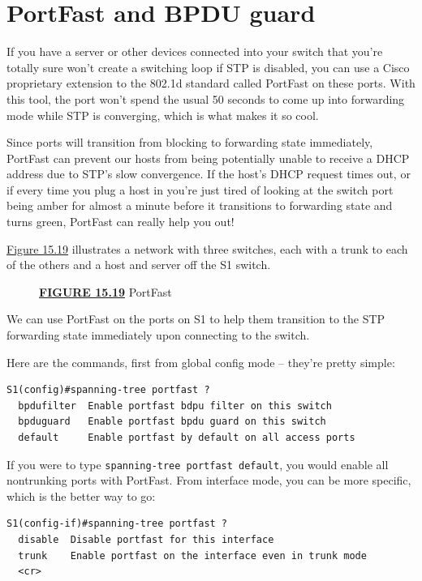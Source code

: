 \documentclass[b5paper,11pt]{memoir}
\begin{document}
\section{PortFast and BPDU guard}

If you have a server or other devices connected into your switch that
you're totally sure won't create a switching loop if STP is disabled,
you can use a Cisco proprietary extension to the 802.1d standard called
PortFast on these ports. With this tool, the port won't spend
the usual 50 seconds
to come up into forwarding mode while STP is converging, which is what
makes it so cool.

Since ports will transition from blocking to forwarding state
immediately, PortFast can prevent our hosts from being potentially
unable to receive a DHCP address due to STP's slow convergence. If the
host's DHCP request times out, or if every time you plug a host in
you're just tired of looking at the switch port being amber for almost a
minute before it transitions to forwarding state and turns green,
PortFast can really help you out!

\protect\hyperlink{c15.xhtmlux5cux23figure15-19}{Figure 15.19}
illustrates a network with three switches, each with a trunk to each of
the others and a host and server off the S1 switch.

\begin{figure}
\centering
\caption{{\protect\hyperlink{c15.xhtmlux5cux23figureanchor15-19}{\textbf{FIGURE
15.19}} PortFast}}
\end{figure}

We can use PortFast on the ports on S1 to help them transition to the
STP forwarding state immediately upon connecting to the switch.

Here are the commands, first from global config mode -- they're pretty
simple:

\begin{verbatim}
S1(config)#spanning-tree portfast ?
  bpdufilter  Enable portfast bdpu filter on this switch
  bpduguard   Enable portfast bpdu guard on this switch
  default     Enable portfast by default on all access ports
\end{verbatim}

If you were to type \texttt{spanning-tree\ portfast\ default}, you would
enable all nontrunking ports with PortFast. From interface mode, you can
be more specific, which is the better way to go:

\begin{verbatim}
S1(config-if)#spanning-tree portfast ?
  disable  Disable portfast for this interface
  trunk    Enable portfast on the interface even in trunk mode
  <cr>
\end{verbatim}
\end{document}
